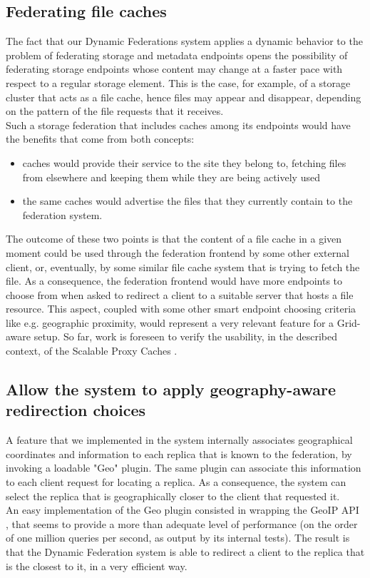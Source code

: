 \documentclass[12pt]{article} %
\begin{document}
\subsection{Federating file caches}

The fact that our Dynamic Federations system applies a dynamic behavior to the problem of federating storage and metadata endpoints opens the possibility of federating storage endpoints whose content may change at a faster pace with respect to a regular storage element.
This is the case, for example, of a storage cluster that acts as a file cache, hence files may appear and disappear, depending on the pattern of the file requests that it receives.\\
Such a storage federation that includes caches among its endpoints would have the benefits that come from both concepts:
\begin{itemize}
\item caches would provide their service to the site they belong to, fetching files from elsewhere and keeping them while they are being actively used
\item the same caches would advertise the files that they currently contain to the federation system.
\end{itemize}
The outcome of these two points is that the content of a file cache in a given moment could be used through the federation frontend by some other external client, or, eventually, by some similar file cache system that is trying to fetch the file. As a consequence, the federation frontend would have more endpoints to choose from when asked to redirect a client to a suitable server that hosts a file resource. This aspect, coupled with some other smart endpoint choosing criteria like e.g. geographic proximity, would represent a very relevant feature for a Grid-aware setup.
So far, work is foreseen to verify the usability, in the described context, of the Scalable Proxy Caches \cite{scalableproxycache}.


\subsection{Allow the system to apply geography-aware redirection choices}

A feature that we implemented in the system internally associates geographical coordinates and information to each replica that is known to the federation, by invoking a loadable "Geo" plugin. The same plugin can associate this information to each client request for locating a replica. As a consequence, the system can select the replica that is geographically closer to the client that requested it.\\
An easy implementation of the Geo plugin consisted in wrapping the GeoIP API \cite{geoip}, that seems to provide a more than adequate level of performance (on the order of one million queries per second, as output by its internal tests). The result is that the Dynamic Federation system is able to redirect a client to the replica that is the closest to it, in a very efficient way.
\end{document}

